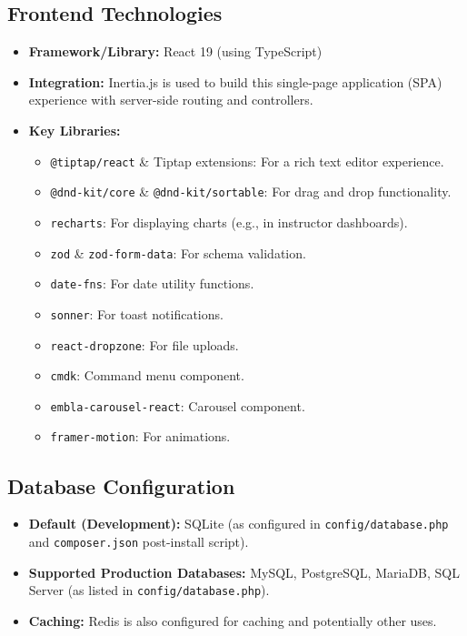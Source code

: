 \documentclass[12pt,a4paper]{article}
\begin{document}
\subsection{Frontend Technologies}
\begin{itemize}
    \item \textbf{Framework/Library:} React 19 (using TypeScript)
    \item \textbf{Integration:} Inertia.js is used to build this single-page application (SPA) experience with server-side routing and controllers.
    \item \textbf{Key Libraries:}
    \begin{itemize}
        \item \texttt{@tiptap/react} \& Tiptap extensions: For a rich text editor experience.
        \item \texttt{@dnd-kit/core} \& \texttt{@dnd-kit/sortable}: For drag and drop functionality.
        \item \texttt{recharts}: For displaying charts (e.g., in instructor dashboards).
        \item \texttt{zod} \& \texttt{zod-form-data}: For schema validation.
        \item \texttt{date-fns}: For date utility functions.
        \item \texttt{sonner}: For toast notifications.
        \item \texttt{react-dropzone}: For file uploads.
        \item \texttt{cmdk}: Command menu component.
        \item \texttt{embla-carousel-react}: Carousel component.
        \item \texttt{framer-motion}: For animations.
    \end{itemize}
\end{itemize}

\subsection{Database Configuration}
\begin{itemize}
    \item \textbf{Default (Development):} SQLite (as configured in \texttt{config/database.php} and \texttt{composer.json} post-install script).
    \item \textbf{Supported Production Databases:} MySQL, PostgreSQL, MariaDB, SQL Server (as listed in \texttt{config/database.php}).
    \item \textbf{Caching:} Redis is also configured for caching and potentially other uses.
\end{itemize}
\end{document}
